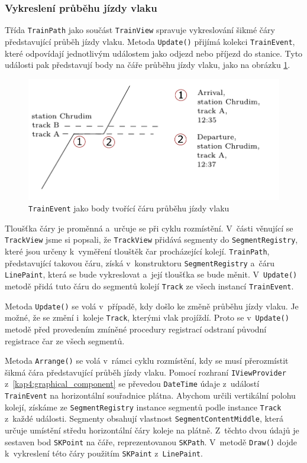 \subsubsection*{Vykreslení průběhu jízdy vlaku}
\label{kap4:vykresleni_prubehu_jizdy_vlaku}
Třída \texttt{TrainPath} jako součást \texttt{TrainView} spravuje vykreslování šikmé čáry představující průběh jízdy vlaku. Metoda \texttt{Update()} přijímá kolekci \texttt{TrainEvent}, které odpovídají jednotlivým událostem jako odjezd nebo příjezd do stanice. Tyto události pak představují body na čáře průběhu jízdy vlaku, jako na obrázku \ref{fig:kap4:gttg-model-trainPath}.

\begin{figure}[!hbt]
	\includegraphics[width=\textwidth]{../img/kap4_train_event_to_train_path}
	\caption{\texttt{TrainEvent} jako body tvořící čáru průběhu jízdy vlaku}
	\label{fig:kap4:gttg-model-trainPath}
\end{figure}

Tloušťka čáry je proměnná a~určuje se při cyklu rozmístění. V~části věnující se \texttt{TrackView} jsme si popsali, že \texttt{TrackView} přidává segmenty do \texttt{SegmentRegistry}, které jsou určeny k~vyměření tlouštěk čar procházející kolejí. \texttt{TrainPath}, představující takovou čáru, získá v~konstruktoru \texttt{SegmentRegistry} a~čáru \texttt{LinePaint}, která se bude vykreslovat a~její tloušťka se bude měnit. V~\texttt{Update()} metodě přidá tuto čáru do segmentů kolejí \texttt{Track} ze všech instancí \texttt{TrainEvent}. 

Metoda \texttt{Update()} se volá v~případě, kdy došlo ke změně průběhu jízdy vlaku. Je možné, že se změní i~koleje \texttt{Track}, kterými vlak projíždí. Proto se v~\texttt{Update()} metodě před provedením zmíněné procedury registrací odstraní původní registrace čar ze všech segmentů.

Metoda \texttt{Arrange()} se volá v~rámci cyklu rozmístění, kdy se musí přerozmístit šikmá čára představující průběh jízdy vlaku. Pomocí rozhraní \texttt{IViewProvider} z~\ref{kap4:graphical_component} se převedou \texttt{DateTime} údaje z~událostí \texttt{TrainEvent} na horizontální souřadnice plátna. Abychom určili vertikální polohu kolejí, získáme ze \texttt{SegmentRegistry} instance segmentů podle instance \texttt{Track} z~každé události. Segmenty obsahují vlastnost \texttt{SegmentContentMiddle}, která určuje umístění středu horizontální čáry koleje na plátně. Z~těchto dvou údajů je sestaven bod \texttt{SKPoint} na čáře, reprezentovanou \texttt{SKPath}. V~metodě \texttt{Draw()} dojde k~vykreslení této čáry použitím \texttt{SKPaint} z~\texttt{LinePaint}.

